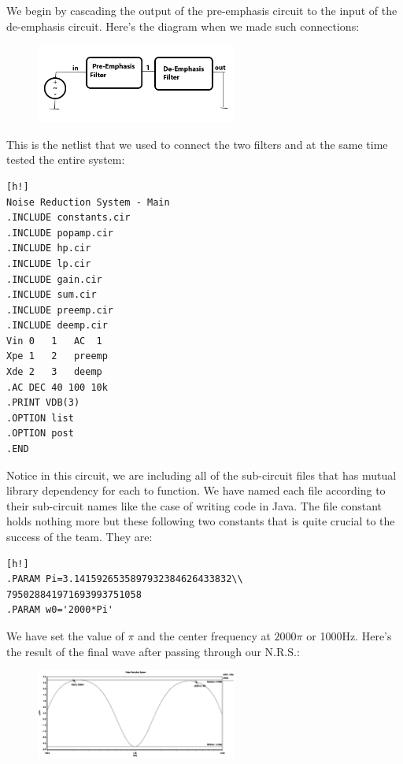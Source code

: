 \documentclass[report]{IEEEtran}
\begin{document}
	We begin by cascading the output of the pre-emphasis circuit to the input of the de-emphasis circuit. Here's the diagram when we made such connections:
	\begin{figure}[h!]
		\label{nrs.cir}
		\begin{center}
			\includegraphics[width=250px]{nrs.jpg}
		\end{center}
	\end{figure}
	\newpage
	This is the netlist that we used to connect the two filters and at the same time tested the entire system:
	\begin{center}
		\begin{lstlisting}[caption=NRS netlist.][h!]
Noise Reduction System - Main
.INCLUDE constants.cir
.INCLUDE popamp.cir
.INCLUDE hp.cir
.INCLUDE lp.cir
.INCLUDE gain.cir
.INCLUDE sum.cir
.INCLUDE preemp.cir
.INCLUDE deemp.cir
Vin	0	1	AC	1
Xpe	1	2	preemp
Xde	2	3	deemp
.AC DEC 40 100 10k
.PRINT VDB(3)
.OPTION list
.OPTION post
.END
		\end{lstlisting}
		\end{center}
		
	Notice in this circuit, we are including all of the sub-circuit files that has mutual library dependency for each to function. We have named each file according to their sub-circuit names like the case of writing code in Java. The file constant holds nothing more but these following two constants that is quite crucial to the success of the team. They are:
		\begin{center}
		\begin{lstlisting}[caption=System constants][h!]
.PARAM Pi=3.1415926535897932384626433832\\
795028841971693993751058
.PARAM w0='2000*Pi'
		\end{lstlisting}
		\end{center}
	We have set the value of $\pi$ and the center frequency at $2000\pi$ or 1000Hz.
	Here's the result of the final wave after passing through our N.R.S.:
	\newpage
	\begin{figure}[h!]
		\begin{center}
			\includegraphics[width=250px]{nrs_plot.eps}
		\end{center}
	\end{figure}
	
\end{document}

